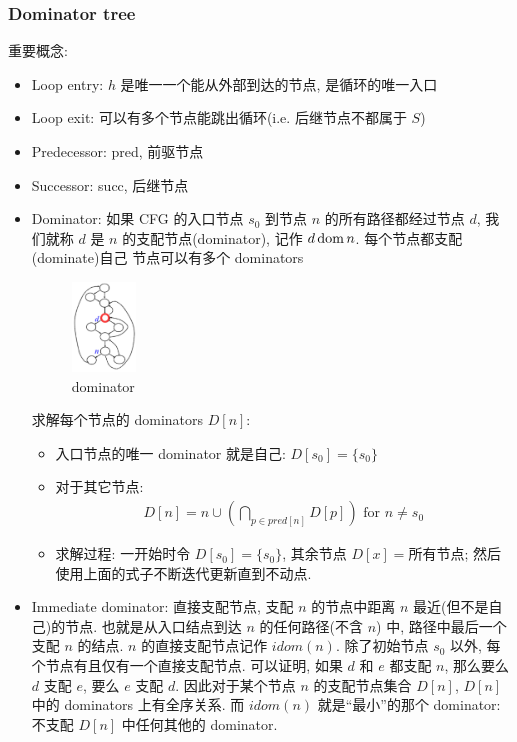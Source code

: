 \subsubsection{Dominator tree}
重要概念:
\begin{itemize}
    \item Loop entry: $h$ 是唯一一个能从外部到达的节点, 是循环的唯一入口
    \item Loop exit: 可以有多个节点能跳出循环(i.e. 后继节点不都属于 $S$)
    \item Predecessor: pred, 前驱节点
    \item Successor: succ, 后继节点
    \item Dominator: 如果 CFG 的入口节点 $s_0$ 到节点 $n$ 的所有路径都经过节点 $d$, 我们就称 $d$ 是 $n$ 的支配节点(dominator), 记作 $d \operatorname*{dom} n$. 
    \subitem 每个节点都支配(dominate)自己
    \subitem 节点可以有多个 dominators
    \begin{figure}[!htb]
        \centering
        \includegraphics[width=0.16\textwidth]{pic/CP18/dominator}
        \caption{dominator}
    \end{figure}
    \subitem 求解每个节点的 dominators $D[n]$:
    \begin{itemize}
        \item 入口节点的唯一 dominator 就是自己: $D[s_0]=\{ s_0 \}$
        \item 对于其它节点: 
        \begin{align*}
            D[n]=n\cup \left( \bigcap_{p\in pred[n]} D[p] \right) \text{ for }n\ne s_0
        \end{align*}
        \item 求解过程: 一开始时令 $D[s_0]=\{ s_0 \}$, 其余节点 $D[x]=$所有节点; 然后使用上面的式子不断迭代更新直到不动点. 
    \end{itemize}
    \item Immediate dominator: 直接支配节点, 支配 $n$ 的节点中距离 $n$ 最近(但不是自己)的节点. 
    \subitem 也就是从入口结点到达 $n$ 的任何路径(不含 $n$) 中, 路径中最后一个支配 $n$ 的结点. 
    \subitem $n$ 的直接支配节点记作 $idom(n)$.
    \subitem 除了初始节点 $s_0$ 以外, 每个节点有且仅有一个直接支配节点.  可以证明, 如果 $d$ 和 $e$ 都支配 $n$, 那么要么 $d$ 支配 $e$, 要么 $e$ 支配 $d$. 因此对于某个节点 $n$ 的支配节点集合 $D[n]$, $D[n]$中的 dominators 上有全序关系. 而 $idom(n)$ 就是``最小''的那个 dominator: 不支配 $D[n]$ 中任何其他的 dominator.

\end{itemize}
